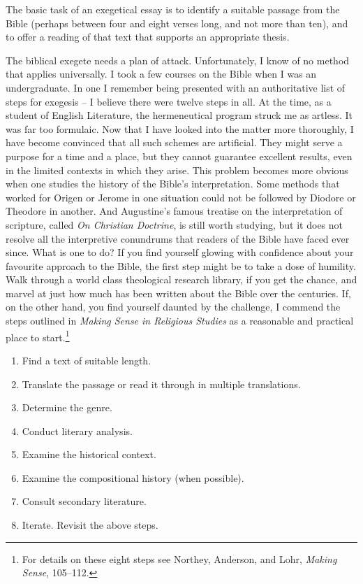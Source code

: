 \documentclass[11pt]{article}
\begin{document}
The basic task of an exegetical essay is to identify a suitable passage
from the Bible (perhaps between four and eight verses long, and not more
than ten), and to offer a reading of that text that supports an
appropriate thesis.

The biblical exegete needs a plan of attack. Unfortunately, I know of no
method that applies universally. I took a few courses on the Bible when
I was an undergraduate. In one I remember being presented with an
authoritative list of steps for exegesis – I believe there were twelve
steps in all. At the time, as a student of English Literature, the
hermeneutical program struck me as artless. It was far too formulaic.
Now that I have looked into the matter more thoroughly, I have become
convinced that all such schemes are artificial. They might serve a
purpose for a time and a place, but they cannot guarantee excellent
results, even in the limited contexts in which they arise. This problem
becomes more obvious when one studies the history of the Bible's
interpretation. Some methods that worked for Origen or Jerome in one
situation could not be followed by Diodore or Theodore in another. And
Augustine's famous treatise on the interpretation of scripture, called
\emph{On Christian Doctrine}, is still worth studying, but it does not
resolve all the interpretive conundrums that readers of the Bible have
faced ever since. What is one to do? If you find yourself glowing with
confidence about your favourite approach to the Bible, the first step
might be to take a dose of humility. Walk through a world class
theological research library, if you get the chance, and marvel at just
how much has been written about the Bible over the centuries. If, on the
other hand, you find yourself daunted by the challenge, I commend the
steps outlined in \emph{Making Sense in Religious Studies} as a
reasonable and practical place to start.\footnote{For details on these
eight steps see Northey, Anderson, and Lohr, \emph{Making Sense},
105–112.}

\begin{enumerate}

\item Find a text of suitable length.

\item Translate the passage or read it through in multiple translations.

\item Determine the genre.

\item Conduct literary analysis.

\item Examine the historical context.

\item Examine the compositional history (when possible).

\item Consult secondary literature.

\item Iterate. Revisit the above steps.

\end{enumerate}
\end{document}

